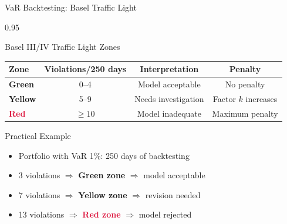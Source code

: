 \documentclass[9pt, aspectratio=169, t]{beamer}
\begin{document}
\begin{frame}{VaR Backtesting: Basel Traffic Light}
    \begin{cminipage}{0.95\textwidth}
    \small
    \begin{block}{Basel III/IV Traffic Light Zones}
        \begin{center}
            \begin{tabular}{lccc}
                \toprule
                \textbf{Zone} & \textbf{Violations/250 days} & \textbf{Interpretation} & \textbf{Penalty} \\
                \midrule
                \cellcolor{Forest!15}\textcolor{Forest}{\textbf{Green}} & 0--4 & Model acceptable & No penalty \\
                \cellcolor{Amber!15}\textcolor{Amber}{\textbf{Yellow}} & 5--9 & Needs investigation & Factor $k$ increases \\
                \cellcolor{Crimson!15}\textcolor{Crimson}{\textbf{Red}} & $\geq 10$ & Model inadequate & Maximum penalty \\
                \bottomrule
            \end{tabular}
        \end{center}
    \end{block}

    \vspace{0.2cm}

    \begin{exampleblock}{Practical Example}
        \begin{itemize}\setlength{\itemsep}{0pt}
            \item Portfolio with VaR 1\%: 250 days of backtesting
            \item 3 violations $\Rightarrow$ \textcolor{Forest}{\textbf{Green zone}} $\Rightarrow$ model acceptable
            \item 7 violations $\Rightarrow$ \textcolor{Amber}{\textbf{Yellow zone}} $\Rightarrow$ revision needed
            \item 13 violations $\Rightarrow$ \textcolor{Crimson}{\textbf{Red zone}} $\Rightarrow$ model rejected
        \end{itemize}
    \end{exampleblock}
    \end{cminipage}
\end{frame}

\end{document}
